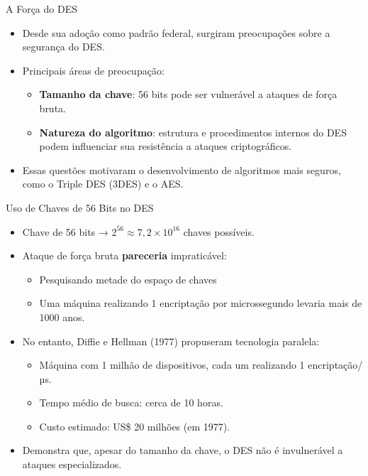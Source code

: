 \begin{frame}{A Força do DES}
    \begin{itemize}
        \item Desde sua adoção como padrão federal, surgiram preocupações sobre a segurança do DES.
        \item Principais áreas de preocupação:
        \begin{itemize}
            \item \textbf{Tamanho da chave}: 56 bits pode ser vulnerável a ataques de força bruta.
            \item \textbf{Natureza do algoritmo}: estrutura e procedimentos internos do DES podem influenciar sua resistência a ataques criptográficos.
        \end{itemize}
        \item Essas questões motivaram o desenvolvimento de algoritmos mais seguros, como o Triple DES (3DES) e o AES.
    \end{itemize}
\end{frame}

\begin{frame}{Uso de Chaves de 56 Bits no DES}
    \begin{itemize}
        \item Chave de 56 bits → $2^{56} \approx 7,2 \times 10^{16}$ chaves possíveis.
        \item Ataque de força bruta \textbf{pareceria} impraticável:
        \begin{itemize}
            \item Pesquisando metade do espaço de chaves
            \item Uma máquina realizando 1 encriptação por microssegundo levaria mais de 1000 anos.
        \end{itemize}
        \item No entanto, Diffie e Hellman (1977) propuseram tecnologia paralela:
        \begin{itemize}
            \item Máquina com 1 milhão de dispositivos, cada um realizando 1 encriptação/µs.
            \item Tempo médio de busca: cerca de 10 horas.
            \item Custo estimado: US\$ 20 milhões (em 1977).
        \end{itemize}
        \item Demonstra que, apesar do tamanho da chave, o DES não é invulnerável a ataques especializados.
    \end{itemize}
\end{frame}


